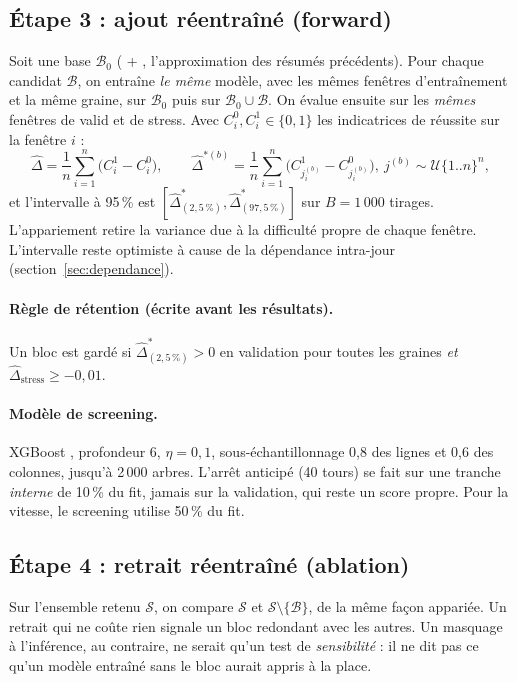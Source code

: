 \subsection{Étape 3 : ajout réentraîné (forward)}
Soit une base $\mathcal{B}_0$ ( + , l'approximation des résumés précédents). Pour chaque candidat $\mathcal{B}$, on entraîne \emph{le même} modèle, avec les mêmes fenêtres d'entraînement et la même graine, sur $\mathcal{B}_0$ puis sur $\mathcal{B}_0\cup\mathcal{B}$. On évalue ensuite sur les \emph{mêmes} fenêtres de valid et de stress. Avec $C_i^{0},C_i^{1}\in\{0,1\}$ les indicatrices de réussite sur la fenêtre $i$ :
\begin{equation}
\hat\Delta=\frac1n\sum_{i=1}^n\big(C_i^{1}-C_i^{0}\big),\qquad
\hat\Delta^{*(b)}=\frac1n\sum_{i=1}^n\big(C_{j_i^{(b)}}^{1}-C_{j_i^{(b)}}^{0}\big),\ j^{(b)}\sim\mathcal{U}\{1..n\}^n,
\end{equation}
et l'intervalle à 95\,\% est $[\hat\Delta^{*}_{(2{,}5\,\%)},\hat\Delta^{*}_{(97{,}5\,\%)}]$ sur $B=1\,000$ tirages. L'appariement retire la variance due à la difficulté propre de chaque fenêtre. L'intervalle reste optimiste à cause de la dépendance intra-jour (section~\ref{sec:dependance}).

\paragraph{Règle de rétention (écrite avant les résultats).} Un bloc est gardé si $\hat\Delta^{*}_{(2{,}5\,\%)}>0$ en validation pour toutes les graines \emph{et} $\hat\Delta_{\text{stress}}\ge-0{,}01$.

\paragraph{Modèle de screening.} XGBoost , profondeur 6, $\eta=0{,}1$, sous-échantillonnage 0,8 des lignes et 0,6 des colonnes, jusqu'à 2\,000 arbres. L'arrêt anticipé (40 tours) se fait sur une tranche \emph{interne} de 10\,\% du fit, jamais sur la validation, qui reste un score propre. Pour la vitesse, le screening utilise 50\,\% du fit.

\subsection{Étape 4 : retrait réentraîné (ablation)}
Sur l'ensemble retenu $\mathcal{S}$, on compare $\mathcal{S}$ et $\mathcal{S}\setminus\{\mathcal{B}\}$, de la même façon appariée. Un retrait qui ne coûte rien signale un bloc redondant avec les autres. Un masquage à l'inférence, au contraire, ne serait qu'un test de \emph{sensibilité} : il ne dit pas ce qu'un modèle entraîné sans le bloc aurait appris à la place.

